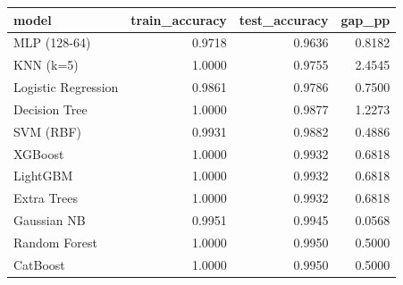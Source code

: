 \begin{tabular}{lrrr}
\toprule
model & train_accuracy & test_accuracy & gap_pp \\
\midrule
MLP (128-64) & 0.9718 & 0.9636 & 0.8182 \\
KNN (k=5) & 1.0000 & 0.9755 & 2.4545 \\
Logistic Regression & 0.9861 & 0.9786 & 0.7500 \\
Decision Tree & 1.0000 & 0.9877 & 1.2273 \\
SVM (RBF) & 0.9931 & 0.9882 & 0.4886 \\
XGBoost & 1.0000 & 0.9932 & 0.6818 \\
LightGBM & 1.0000 & 0.9932 & 0.6818 \\
Extra Trees & 1.0000 & 0.9932 & 0.6818 \\
Gaussian NB & 0.9951 & 0.9945 & 0.0568 \\
Random Forest & 1.0000 & 0.9950 & 0.5000 \\
CatBoost & 1.0000 & 0.9950 & 0.5000 \\
\bottomrule
\end{tabular}
